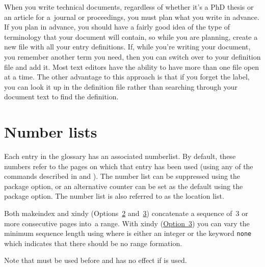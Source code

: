 \documentclass[report,inlinetitle]{nlctdoc}
\newcommand*{\opt}[1]{\hyperlink{option#1}{Option~#1}}
\newcommand*{\optsand}[2]{Options~\hyperlink{option#1}{#1}
and~\hyperlink{option#2}{#2}}
\begin{document}
When you write technical documents, regardless of whether it's a PhD
thesis or an article for a~journal or proceedings, you must plan what you write
in advance. If you plan in advance, you should have a fairly good
idea of the type of terminology that your document will contain,
so while you are planning, create a new file with all your entry
definitions. If, while you're writing your document, you remember
another term you need, then you can switch over to your definition file and
add it. Most text editors have the ability to have more than one
file open at a time. The other advantage to this approach is that if
you forget the label, you can look it up in the definition file
rather than searching through your document text to find the
definition.

\chapter{Number lists}
\label{sec:numberlists}

Each entry in the glossary has an associated \gls{numberlist}.
By default, these numbers refer to the pages on which that entry has
been used (using any of the commands described in
 and ). The number
list can be suppressed using the  package
option, or an alternative counter can be set as the default using
the  package option. The number list is also
referred to as the location list.

Both \gls{makeindex} and \gls{xindy} (\optsand23) concatenate a
sequence of~3 or more consecutive pages into~a range. With 
\gls*{xindy} (\opt3) you can vary the minimum sequence length using
 where  is either
an integer or the keyword \texttt{none} which indicates that there
should be no range formation.

\begin{important}
Note that  must be used before
 and has no effect if  is used.
\end{important}
\end{document}
